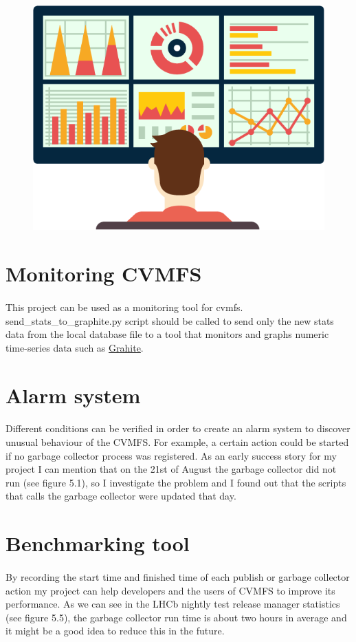 \begin{figure}[h]
\centering
\includegraphics[scale=0.2]{figures/dashboard}
\end{figure}

\section{Monitoring CVMFS}
\paragraph{} This project can be used as a monitoring tool for cvmfs. send\_stats\_to\_graphite.py script should be called to send only the new stats data from the local database file to a tool that monitors and graphs numeric time-series data such as \href{https://graphiteapp.org/}{Grahite}.
\section{Alarm system}
\paragraph{} 
Different conditions can be verified in order to create an alarm system to discover unusual behaviour of the CVMFS. For example, a certain action could be started if no garbage collector process was registered. As an early success story for my project I can mention that on the 21st of August the garbage collector did not run (see figure 5.1), so I investigate the problem and I found out that the scripts that calls the garbage collector were updated that day.
\section{Benchmarking tool}
\paragraph{} By recording the start time and finished time of each publish or garbage collector action my project can help developers and the users of CVMFS to improve its performance. As we can see in the LHCb nightly test release manager statistics (see figure 5.5), the garbage collector run time is about two hours in average and it might be a good idea to reduce this in the future.  
